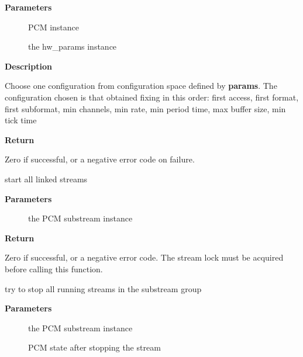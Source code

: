 \documentclass[a4paper,8pt,english]{sphinxmanual}
\begin{document}
\textbf{Parameters}
\begin{description}
\item[{}] \leavevmode
PCM instance

\item[{}] \leavevmode
the hw\_params instance

\end{description}

\textbf{Description}

Choose one configuration from configuration space defined by \textbf{params}.
The configuration chosen is that obtained fixing in this order:
first access, first format, first subformat, min channels,
min rate, min period time, max buffer size, min tick time

\textbf{Return}

Zero if successful, or a negative error code on failure.

\begin{fulllineitems}
\label{sound/kernel-api/alsa-driver-api:c.snd_pcm_start}
start all linked streams

\end{fulllineitems}


\textbf{Parameters}
\begin{description}
\item[{}] \leavevmode
the PCM substream instance

\end{description}

\textbf{Return}

Zero if successful, or a negative error code.
The stream lock must be acquired before calling this function.

\begin{fulllineitems}
\label{sound/kernel-api/alsa-driver-api:c.snd_pcm_stop}
try to stop all running streams in the substream group

\end{fulllineitems}


\textbf{Parameters}
\begin{description}
\item[{}] \leavevmode
the PCM substream instance

\item[{}] \leavevmode
PCM state after stopping the stream

\end{description}
\end{document}
